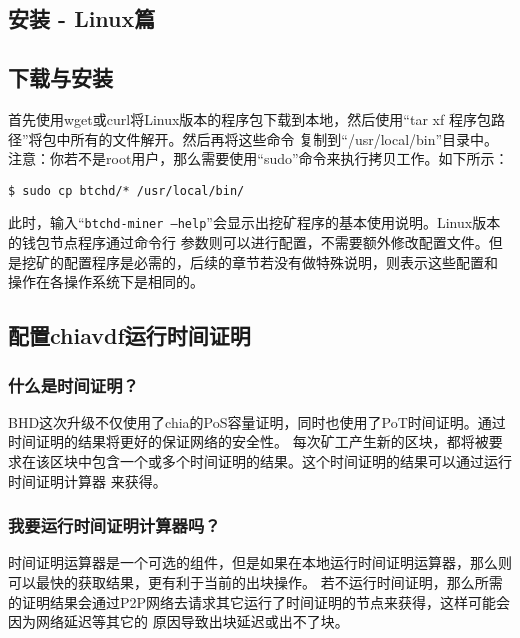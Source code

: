 \begin{flushleft}
\section{安装 - Linux篇}
\subsection{下载与安装}
\begin{flushleft}
    首先使用wget或curl将Linux版本的程序包下载到本地，然后使用``tar xf 程序包路径''将包中所有的文件解开。然后再将这些命令
    复制到``/usr/local/bin''目录中。注意：你若不是root用户，那么需要使用``sudo''命令来执行拷贝工作。如下所示：
\end{flushleft}
\scriptsize
\begin{verbatim}
$ sudo cp btchd/* /usr/local/bin/
\end{verbatim}
\normalsize
\begin{flushleft}
    此时，输入``\texttt{btchd-miner --help}''会显示出挖矿程序的基本使用说明。Linux版本的钱包节点程序通过命令行
    参数则可以进行配置，不需要额外修改配置文件。但是挖矿的配置程序是必需的，后续的章节若没有做特殊说明，则表示这些配置和
    操作在各操作系统下是相同的。
\end{flushleft}
\subsection{配置chiavdf运行时间证明}
\subsubsection{什么是时间证明？}
\begin{flushleft}
    BHD这次升级不仅使用了chia的PoS容量证明，同时也使用了PoT时间证明。通过时间证明的结果将更好的保证网络的安全性。
    每次矿工产生新的区块，都将被要求在该区块中包含一个或多个时间证明的结果。这个时间证明的结果可以通过运行时间证明计算器
    来获得。
\end{flushleft}
\subsubsection{我要运行时间证明计算器吗？}
\begin{flushleft}
    时间证明运算器是一个可选的组件，但是如果在本地运行时间证明运算器，那么则可以最快的获取结果，更有利于当前的出块操作。
    若不运行时间证明，那么所需的证明结果会通过P2P网络去请求其它运行了时间证明的节点来获得，这样可能会因为网络延迟等其它的
    原因导致出块延迟或出不了块。
\end{flushleft}

\end{flushleft}
